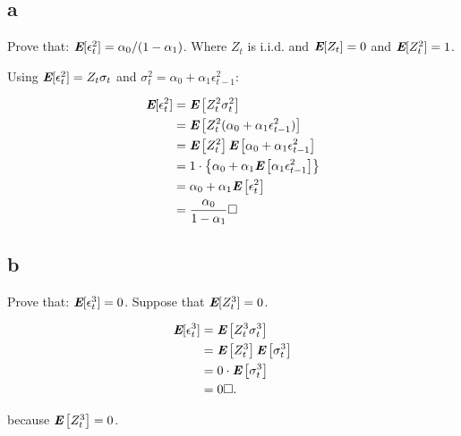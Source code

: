 \subsection{a}
\label{subsection_3_a}
Prove that: $\textbf{\em E}[\epsilon^2_t] = \alpha_0/(1-\alpha_1)$.
Where $Z_t$ is i.i.d. and $\textbf{\em E}[Z_t] = 0$ and $\textbf{\em E}[Z_t^2] = 1$.

\begin{solution}

Using $\textbf{\em E}[\epsilon^2_t] = Z_t\sigma_t$ and $\sigma_t^2 = \alpha_0 + \alpha_1 \epsilon_{t-1}^2$:

\begin{equation}
\begin{aligned}
\textbf{\em E}[\epsilon^2_t] & = \textbf{\em E}\left[Z_t^2\sigma_t^2\right] \\
												 & = \textbf{\em E}\left[Z_t^2(\alpha_0 + \alpha_1 \epsilon_{t-1}^2)\right] \\
												 & = \textbf{\em E}\left[Z_t^2\right] \textbf{\em E}\left[\alpha_0 + \alpha_1 \epsilon_{t-1}^2\right] \\
												 & = 1 \cdot \left\{\alpha_0 + \alpha_1\textbf{\em E}\left[\alpha_1 \epsilon_{t-1}^2\right] \right\} \\
												 & = \alpha_0 + \alpha_1\textbf{\em E}\left[\epsilon_{t}^2\right] \\
										     & = \frac{\alpha_0}{1 - \alpha_1} \square
\end{aligned}
\end{equation}
\end{solution}

\subsection{b}
\label{subsection_3_b}
Prove that: $\textbf{\em E}[\epsilon^3_t] = 0$.
Suppose that $\textbf{\em E}[Z_t^3] = 0$.

\begin{solution}

\begin{equation}
\begin{aligned}
\textbf{\em E}[\epsilon^3_t] & = \textbf{\em E}\left[Z_t^3\sigma_t^3\right] \\
												 & = \textbf{\em E}\left[Z_t^3\right] \textbf{\em E}\left[\sigma_t^3\right] \\
												 & = 0 \cdot \textbf{\em E}\left[\sigma_t^3\right] \\
												 & = 0 \square.
\end{aligned}
\end{equation}

because $\textbf{\em E}\left[Z_t^3\right]=0$.
\end{solution}


